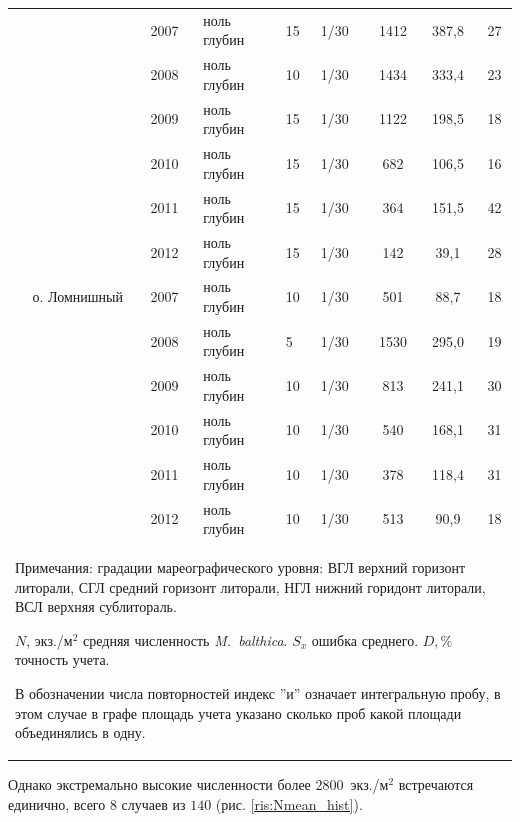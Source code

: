 \documentclass[12pt, a4paper]{disser}
\begin{document}
\begin{footnotesize}
\begin{longtable}{|p{2cm}|p{3cm}|p{1cm}|p{2cm}|p{1.5cm}|p{1cm}|*{3}{c|}}
		\\ \cline{3-9}
		 &  & 2007 & ноль глубин & 15 & 1/30 & 1412 & 387,8 & 27
		\\ \cline{3-9}
		 &  & 2008 & ноль глубин & 10 & 1/30 & 1434 & 333,4 & 23
		\\ \cline{3-9}
		 &  & 2009 & ноль глубин & 15 & 1/30 & 1122 & 198,5 & 18
		\\ \cline{3-9}
		 &  & 2010 & ноль глубин & 15 & 1/30 & 682 & 106,5 & 16
		\\ \cline{3-9}
		 &  & 2011 & ноль глубин & 15 & 1/30 & 364 & 151,5 & 42
		\\ \cline{3-9}
		 &  & 2012 & ноль глубин & 15 & 1/30 & 142 & 39,1 & 28
		\\ \cline{2-9}
	 & о. Ломнишный & 2007 & ноль глубин & 10 & 1/30 & 501 & 88,7 & 18
		\\ \cline{3-9}
		 &  & 2008 & ноль глубин & 5 & 1/30 & 1530 & 295,0 & 19
		\\ \cline{3-9}
		 &  & 2009 & ноль глубин & 10 & 1/30 & 813 & 241,1 & 30
	\\ \cline{3-9}
	 &  & 2010 & ноль глубин & 10 & 1/30 & 540 & 168,1 & 31
	\\ \cline{3-9}
	 &  & 2011 & ноль глубин & 10 & 1/30 & 378 & 118,4 & 31
	\\ \cline{3-9}
	 &  & 2012 & ноль глубин & 10 & 1/30 & 513 & 90,9 & 18
	\\ \hline
	\multicolumn{9}{p{16cm}}{Примечания: градации мареографического уровня: ВГЛ \textemdash верхний горизонт литорали, СГЛ \textemdash средний горизонт литорали, НГЛ \textemdash нижний горидонт литорали, ВСЛ \textemdash верхняя сублитораль. 

	$N$, экз./м$^2$ \textemdash средняя численность {\it M.~balthica}. 
	$S_x$ \textemdash ошибка среднего.
	 $D, \%$ \textemdash  точность учета.

	В обозначении числа повторностей индекс ''и'' означает интегральную пробу, в этом случае в графе площадь учета указано сколько проб какой площади объединялись в одну.}
	\end{longtable}
	\end{footnotesize}
%
Однако экстремально высокие численности \textemdash более $2800$~экз./м$^2$ \textemdash встречаются единично, всего $8$ случаев из $140$ (рис. \ref{ris:Nmean_hist}).
%
\end{document}
